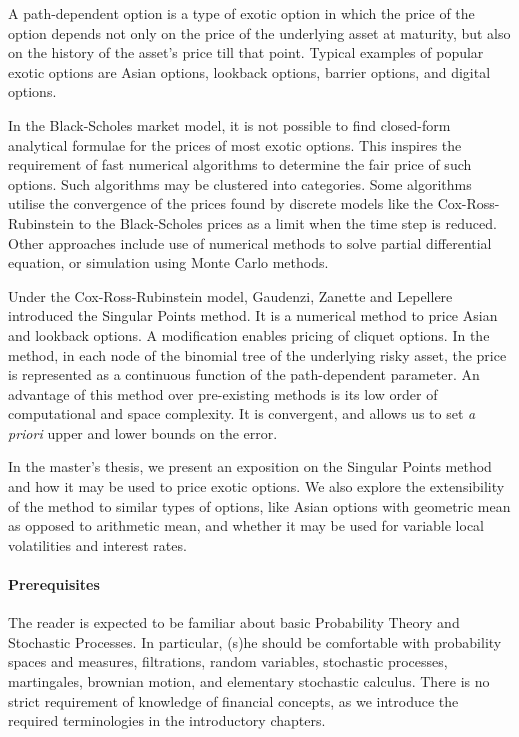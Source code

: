 
A path-dependent option is a type of exotic option in which the price of the option depends not only on the price of the underlying asset at maturity, but also on the history of the asset's price till that point. Typical examples of popular exotic options are Asian options, lookback options, barrier options, and digital options.

In the Black-Scholes market model, it is not possible to find closed-form analytical formulae for the prices of most exotic options. This inspires the requirement of fast numerical algorithms to determine the fair price of such options. Such algorithms may be clustered into categories. Some algorithms utilise the convergence of the prices found by discrete models like the Cox-Ross-Rubinstein to the Black-Scholes prices as a limit when the time step is reduced. Other approaches include use of numerical methods to solve partial differential equation, or simulation using Monte Carlo methods.

Under the Cox-Ross-Rubinstein model, Gaudenzi, Zanette and Lepellere introduced the Singular Points method. It is a numerical method to price Asian and lookback options. A modification enables pricing of cliquet options. In the method, in each node of the binomial tree of the underlying risky asset, the price is represented as a continuous function of the path-dependent parameter. An advantage of this method over pre-existing methods is its low order of computational and space complexity. It is convergent, and allows us to set \emph{a priori} upper and lower bounds on the error.

In the master's thesis, we present an exposition on the Singular Points method and how it may be used to price exotic options. We also explore the extensibility of the method to similar types of options, like Asian options with geometric mean as opposed to arithmetic mean, and whether it may be used for variable local volatilities and interest rates.


\paragraph{Prerequisites}
The reader is expected to be familiar about basic Probability Theory and Stochastic Processes. In particular, (s)he should be comfortable with probability spaces and measures, filtrations, random variables, stochastic processes, martingales, brownian motion, and elementary stochastic calculus. There is no strict requirement of knowledge of financial concepts, as we introduce the required terminologies in the introductory chapters.

